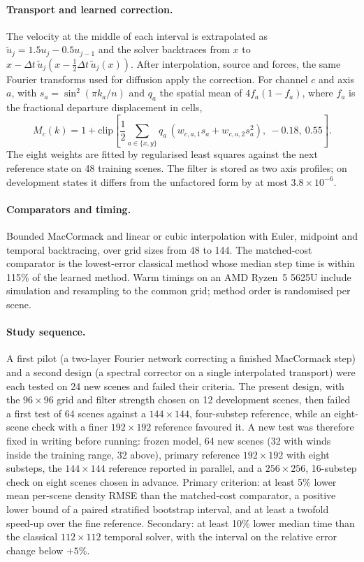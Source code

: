 \documentclass[11pt]{article}
\begin{document}
\paragraph{Transport and learned correction.} The velocity at the middle of each interval is extrapolated as
$\tilde u_j=1.5u_j-0.5u_{j-1}$ and the solver backtraces from $x$ to $x-\Delta t\,\tilde u_j(x-\frac12\Delta
t\,\tilde u_j(x))$. After interpolation, source and forces, the same Fourier transforms used for diffusion apply the
correction. For channel $c$ and axis $a$, with $s_a=\sin^2(\pi k_a/n)$ and $q_a$ the spatial mean of
$4f_a(1-f_a)$, where $f_a$ is the fractional departure displacement in cells,
\begin{equation}
 M_c(k)=1+\mathrm{clip}[\frac{1}{2}\sum_{a\in\{x,y\}}q_a\,(w_{c,a,1}s_a+w_{c,a,2}s_a^2),\ -0.18,\ 0.55].
\end{equation}
The eight weights are fitted by regularised least squares against the next reference state on 48 training scenes.
The filter is stored as two axis profiles; on development states it differs from the unfactored form by at most
$3.8\times10^{-6}$.

\paragraph{Comparators and timing.} Bounded MacCormack and linear or cubic interpolation with Euler, midpoint and
temporal backtracing, over grid sizes from 48 to 144. The matched-cost comparator is the lowest-error classical method
whose median step time is within 115\% of the learned method. Warm timings on an AMD Ryzen~5 5625U include simulation
and resampling to the common grid; method order is randomised per scene.

\paragraph{Study sequence.} A first pilot (a two-layer Fourier network correcting a finished MacCormack step) and a
second design (a spectral corrector on a single interpolated transport) were each tested on 24 new scenes and failed
their criteria. The present design, with the $96\times96$ grid and filter strength chosen on 12 development scenes,
then failed a first test of 64 scenes against a $144\times144$, four-substep reference, while an eight-scene check
with a finer $192\times192$ reference favoured it. A new test was therefore fixed in writing before running: frozen
model, 64 new scenes (32 with winds inside the training range, 32 above), primary reference $192\times192$ with eight
substeps, the $144\times144$ reference reported in parallel, and a $256\times256$, 16-substep check on eight scenes
chosen in advance. Primary criterion: at least 5\% lower mean per-scene density RMSE than the matched-cost comparator,
a positive lower bound of a paired stratified bootstrap interval, and at least a twofold speed-up over the fine
reference. Secondary: at least 10\% lower median time than the classical $112\times112$ temporal solver, with the
interval on the relative error change below $+5\%$.
\end{document}
